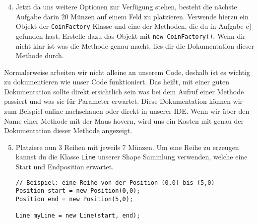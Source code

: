 \begin{enumerate}[label=\alph*)] \setcounter{enumi}{3}
    \item Jetzt da uns weitere Optionen zur Verfügung stehen, besteht die nächste Aufgabe darin 20 Münzen auf einem Feld zu platzieren. Verwende hierzu ein Objekt der \texttt{CoinFactory} Klasse und eine der Methoden, die du in Aufgabe c) gefunden hast. Erstelle dazu das Objekt mit \texttt{new CoinFactory()}. Wenn dir nicht klar ist was die Methode genau macht, lies dir die Dokumentation dieser Methode durch.

\end{enumerate}

\begin{Infobox}
    Normalerweise arbeiten wir nicht alleine an unserem Code, deshalb ist es wichtig zu dokumentieren wie unser Code funktioniert. Das heißt, mit einer guten Dokumentation sollte direkt ersichtlich sein was bei dem Aufruf einer Methode passiert und was sie für Parameter erwartet. Diese Dokumentation können wir zum Beispiel online nachschauen oder direkt in unserer IDE. Wenn wir über den Name einer Methode mit der Maus hovern, wird uns ein Kasten mit genau der Dokumentation dieser Methode angezeigt.
\end{Infobox}


\begin{enumerate}[label=\alph*)] \setcounter{enumi}{4}
    \item Platziere nun 3 Reihen mit jeweils 7 Münzen. Um eine Reihe zu erzeugen kannst du die Klasse \texttt{Line} unserer Shape Sammlung verwenden, welche eine Start und Endposition erwartet.

    \begin{lstlisting}
// Beispiel: eine Reihe von der Position (0,0) bis (5,0)
Position start = new Position(0,0);
Position end = new Position(5,0);

Line myLine = new Line(start, end);
    \end{lstlisting}

\end{enumerate}
